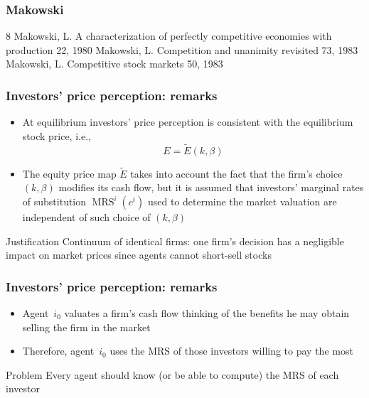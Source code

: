 \documentclass[blue]{beamer}
\DeclareMathOperator\MRS{MRS}
\theoremstyle{definition}
\theoremstyle{example}
\begin{document}
\begin{frame}\frametitle{Makowski}
\begin{thebibliography}{8}
  \beamertemplatearticlebibitems
    Makowski, L.
    \newblock A characterization of perfectly competitive economies with production
     22, 1980
    Makowski, L.
    \newblock Competition and unanimity revisited
     73, 1983
    Makowski, L.
    \newblock Competitive stock markets
     50, 1983
    \end{thebibliography}
\end{frame}
\begin{frame}\frametitle{Investors' price perception: remarks}
\begin{itemize}
\item At equilibrium investors' price perception is consistent with the equilibrium stock price, i.e.,
\[
E = \widetilde{E}(k,\beta)
\]
\item The equity price map $\widetilde{E}$ takes into account the fact that the firm's choice $(k,\beta)$ modifies its cash flow, but it is assumed that investors' marginal rates of substitution $\MRS^i(c^i)$ used to determine the market valuation are independent of such choice of $(k,\beta)$
\end{itemize}
\begin{block}{Justification}
Continuum of identical firms: one firm's decision has a negligible impact on market prices since agents cannot short-sell stocks
\end{block}
\end{frame}
\begin{frame}\frametitle{Investors' price perception: remarks}
\begin{itemize}
\item Agent~$i_0$ valuates a firm's cash flow thinking of the benefits he may obtain selling the firm in the market
\item Therefore, agent~$i_0$ uses the MRS of those investors willing to pay the most
\end{itemize}
\begin{block}{Problem}
Every agent should know (or be able to compute) the MRS of each investor
\end{block}
\end{frame}
\end{document}

